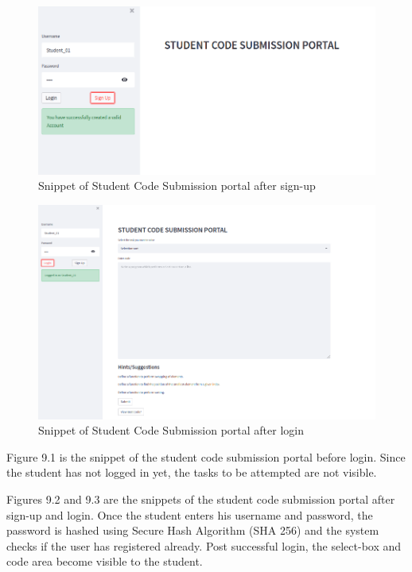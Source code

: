 \begin{figure}[H]
\centering
\includegraphics[scale=0.6,frame]{./figures/dep2.png}
\caption{Snippet of Student Code Submission portal after sign-up}
\label{fig1}
\end{figure}

\begin{figure}[H]
\centering
\includegraphics[scale=0.6,frame]{./figures/dep3.png}
\caption{Snippet of Student Code Submission portal after login}
\label{fig2}
\end{figure}


Figure 9.1 is the snippet of the student code submission portal before
login. Since the student has not logged in yet, the tasks to be
attempted are not visible.

Figures 9.2 and 9.3 are the snippets of the student code submission
portal after sign-up and login. Once the student enters his username
and password, the password is hashed using Secure Hash Algorithm (SHA
256) and the system checks if the user has registered already. Post
successful login, the select-box and code area become visible to the
student.

